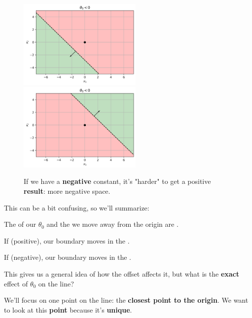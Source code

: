 \begin{itemize}
                \begin{figure}[H]
                    \centering                         \includegraphics[width=60mm,scale=0.5]{images/classification_images/theta_0_less_zero.png}
                    \includegraphics[width=60mm,scale=0.5]{images/classification_images/negative_theta0_positive_theta.png}
                        \caption*{If we have a \textbf{negative} constant, it's "harder" to get a positive \textbf{result}: more negative space.}
                \end{figure}
        \end{itemize}
        
        This can be a bit confusing, so we'll summarize:\\
        
            \begin{concept}
                The  of our $\theta_0$ and the  we move away from the origin are .
                
                If  (positive), our boundary moves in the .
                
                If  (negative), our boundary moves in the .
            \end{concept}
        
        This gives us a general idea of how the offset affects it, but what is the \textbf{exact} effect of $\theta_0$ on the line?
        
        We'll focus on one point on the line: the \textbf{closest point to the origin}. We want to look at this \textbf{point} because it's \textbf{unique}.
    
